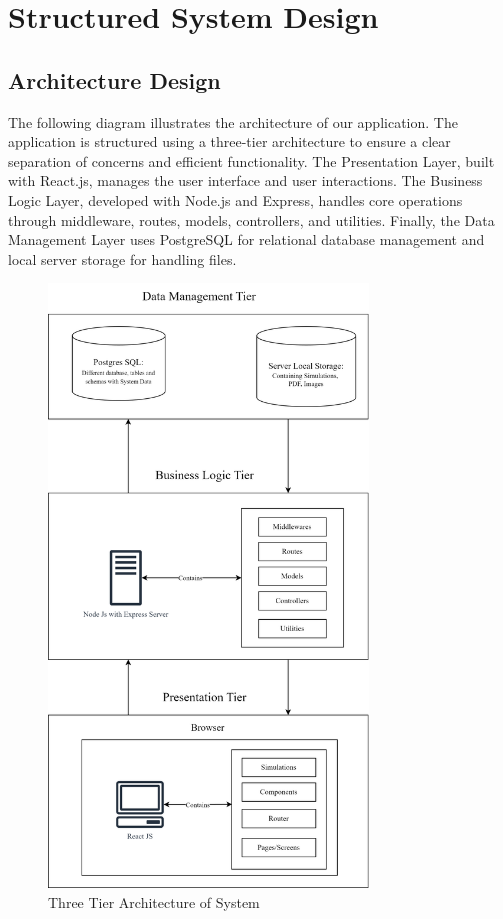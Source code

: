 \section{Structured System Design}
\subsection{Architecture Design}
The following diagram illustrates the architecture of our application. The application is structured using a three-tier architecture to ensure a clear separation of concerns and efficient functionality. The Presentation Layer, built with React.js, manages the user interface and user interactions. The Business Logic Layer, developed with Node.js and Express, handles core operations through middleware, routes, models, controllers, and utilities. Finally, the Data Management Layer uses PostgreSQL for relational database management and local server storage for handling files.
\begin{figure}[H]
    \centering
    \includegraphics[height=16cm]{Diagrams/Main_Block.png}
    \caption{Three Tier Architecture of System}
\end{figure}
\newpage
